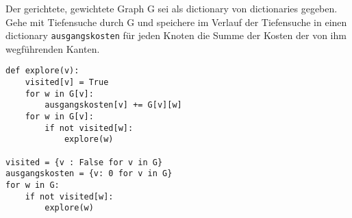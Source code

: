 ﻿\question[6]
Der gerichtete, gewichtete Graph G sei als dictionary von
dictionaries gegeben. Gehe mit Tiefensuche durch G und
speichere im Verlauf der Tiefensuche in einen dictionary \texttt{ausgangskosten} für jeden Knoten die Summe der Kosten der von ihm wegführenden Kanten.

\begin{solutionbox}{10cm}
\begin{lstlisting}
def explore(v):
    visited[v] = True
    for w in G[v]:
        ausgangskosten[v] += G[v][w]
    for w in G[v]:
        if not visited[w]:
            explore(w)

visited = {v : False for v in G}
ausgangskosten = {v: 0 for v in G}
for w in G:
    if not visited[w]:
        explore(w)

\end{lstlisting}
\end{solutionbox}
